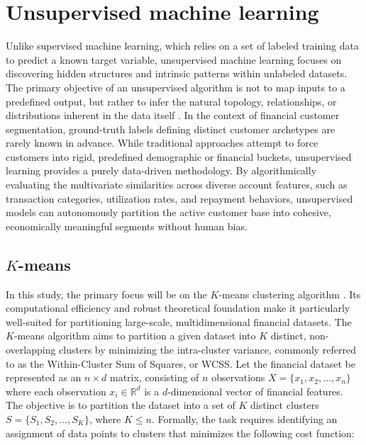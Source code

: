     \section{Unsupervised machine learning}
    \label{sec:unsupervised_ml}
    Unlike supervised machine learning, which relies on a set of labeled training data to predict a known target variable, unsupervised machine learning focuses on discovering hidden structures and intrinsic patterns within unlabeled datasets.
    The primary objective of an unsupervised algorithm is not to map inputs to a predefined output, but rather to infer the natural topology, relationships, or distributions inherent in the data itself \cite{naeem_unsupervised_2023}.
    In the context of financial customer segmentation, ground-truth labels defining distinct customer archetypes are rarely known in advance.
    While traditional approaches attempt to force customers into rigid, predefined demographic or financial buckets, unsupervised learning provides a purely data-driven methodology.
    By algorithmically evaluating the multivariate similarities across diverse account features, such as transaction categories, utilization rates, and repayment behaviors, unsupervised models can autonomously partition the active customer base into cohesive, economically meaningful segments without human bias.
    
        \subsection{$K$-means}
        \label{subsec:kmeans}
        In this study, the primary focus will be on the $K$-means clustering algorithm \cite{naeem_unsupervised_2023}.
        Its computational efficiency and robust theoretical foundation make it particularly well-suited for partitioning large-scale, multidimensional financial datasets.
        The $K$-means algorithm aims to partition a given dataset into $K$ distinct, non-overlapping clusters by minimizing the intra-cluster variance, commonly referred to as the Within-Cluster Sum of Squares, or WCSS.
        Let the financial dataset be represented as an $n \times d$ matrix, consisting of $n$ observations $X = \{x_1, x_2, \dots, x_n\}$ where each observation $x_i \in \mathbb{R}^d$ is a $d$-dimensional vector of financial features.
        The objective is to partition the dataset into a set of $K$ distinct clusters $S = \{S_1, S_2, \dots, S_K\}$, where $K \le n$.
        Formally, the task requires identifying an assignment of data points to clusters that minimizes the following cost function:
            
